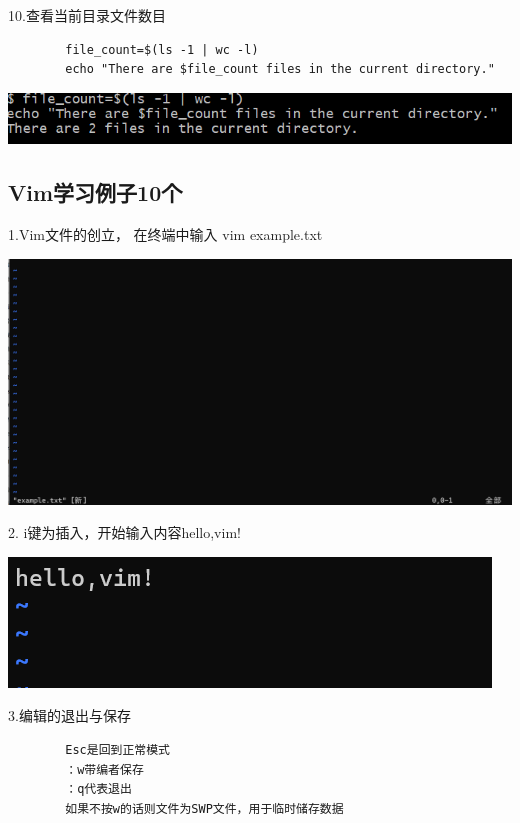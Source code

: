 \documentclass{article}
\begin{document}
	10.查看当前目录文件数目
	\begin{verbatim}
		file_count=$(ls -1 | wc -l)
		echo "There are $file_count files in the current directory."
	\end{verbatim}
	
	
	\noindent
	\begin{minipage}{\linewidth}
		\centering
		\includegraphics[width=0.5\linewidth]{example10.png}
		\label{fig:example}
	\end{minipage}
	
	
	
	\subsection{Vim学习例子10个}
	1.Vim文件的创立，
	在终端中输入 vim example.txt
	
	
	\noindent
	\begin{minipage}{\linewidth}
		\centering
		\includegraphics[width=0.5\linewidth]{example11.png}
		\label{fig:example}
	\end{minipage}
	
	2. i键为插入，开始输入内容hello,vim!
	
	\noindent
	\begin{minipage}{\linewidth}
		\centering
		\includegraphics[width=0.5\linewidth]{example12.png}
		\label{fig:example}
	\end{minipage}
	
	3.编辑的退出与保存
	\begin{verbatim}
		Esc是回到正常模式
		：w带编者保存
		：q代表退出
		如果不按w的话则文件为SWP文件，用于临时储存数据
	\end{verbatim}
	
\end{document}
